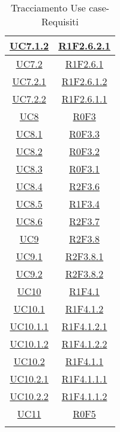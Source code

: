 \begin{longtable}{|c|c|}
\hline
\hyperlink{UC7.1.2}{UC7.1.2} & \hyperlink{R1F2.6.2.1}{R1F2.6.2.1}\\
\hline
\hyperlink{UC7.2}{UC7.2} & \hyperlink{R1F2.6.1}{R1F2.6.1}\\
\hline
\hyperlink{UC7.2.1}{UC7.2.1} & \hyperlink{R1F2.6.1.2}{R1F2.6.1.2}\\
\hline
\hyperlink{UC7.2.2}{UC7.2.2} & \hyperlink{R1F2.6.1.1}{R1F2.6.1.1}\\
\hline
\hyperlink{UC8}{UC8} & \hyperlink{R0F3}{R0F3}\\
\hline
\hyperlink{UC8.1}{UC8.1} & \hyperlink{R0F3.3}{R0F3.3}\\
\hline
\hyperlink{UC8.2}{UC8.2} & \hyperlink{R0F3.2}{R0F3.2}\\
\hline
\hyperlink{UC8.3}{UC8.3} & \hyperlink{R0F3.1}{R0F3.1}\\
\hline
\hyperlink{UC8.4}{UC8.4} & \hyperlink{R2F3.6}{R2F3.6}\\
\hline
\hyperlink{UC8.5}{UC8.5} & \hyperlink{R1F3.4}{R1F3.4}\\
\hline
\hyperlink{UC8.6}{UC8.6} & \hyperlink{R2F3.7}{R2F3.7}\\
\hline
\hyperlink{UC9}{UC9} & \hyperlink{R2F3.8}{R2F3.8}\\
\hline
\hyperlink{UC9.1}{UC9.1} & \hyperlink{R2F3.8.1}{R2F3.8.1}\\
\hline
\hyperlink{UC9.2}{UC9.2} & \hyperlink{R2F3.8.2}{R2F3.8.2}\\
\hline
\hyperlink{UC10}{UC10} & \hyperlink{R1F4.1}{R1F4.1}\\
\hline
\hyperlink{UC10.1}{UC10.1} & \hyperlink{R1F4.1.2}{R1F4.1.2}\\
\hline
\hyperlink{UC10.1.1}{UC10.1.1} & \hyperlink{R1F4.1.2.1}{R1F4.1.2.1}\\
\hline
\hyperlink{UC10.1.2}{UC10.1.2} & \hyperlink{R1F4.1.2.2}{R1F4.1.2.2}\\
\hline
\hyperlink{UC10.2}{UC10.2} & \hyperlink{R1F4.1.1}{R1F4.1.1}\\
\hline
\hyperlink{UC10.2.1}{UC10.2.1} & \hyperlink{R1F4.1.1.1}{R1F4.1.1.1}\\
\hline
\hyperlink{UC10.2.2}{UC10.2.2} & \hyperlink{R1F4.1.1.2}{R1F4.1.1.2}\\
\hline
\hyperlink{UC11}{UC11} & \hyperlink{R0F5}{R0F5}\\
\hline
\caption[Tracciamento Use case-Requisiti]{Tracciamento Use case-Requisiti}
\label{tabella:requi-usecase}
\end{longtable}
\clearpage
